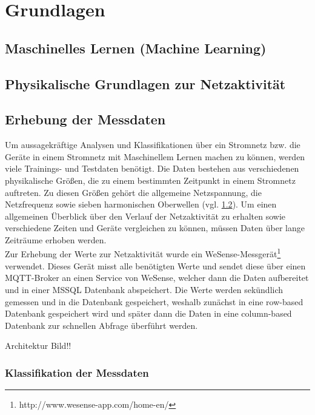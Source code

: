 \chapter{Grundlagen}

\section{Maschinelles Lernen (Machine Learning)}

\section{Physikalische Grundlagen zur Netzaktivität} \label{physikalischeGrundlagen}

\section{Erhebung der Messdaten}

    Um aussagekräftige Analysen und Klassifikationen über ein Stromnetz bzw. die Geräte in einem Stromnetz mit Maschinellem Lernen machen zu können, werden viele Trainings- und Testdaten benötigt.
    Die Daten bestehen aus verschiedenen physikalische Größen, die zu einem bestimmten Zeitpunkt in einem Stromnetz auftreten.
    Zu diesen Größen gehört die allgemeine Netzspannung, die Netzfrequenz sowie sieben harmonischen Oberwellen (vgl. \ref{physikalischeGrundlagen}).
    Um einen allgemeinen Überblick über den Verlauf der Netzaktivität zu erhalten sowie verschiedene Zeiten und Geräte vergleichen zu können, müssen Daten über lange Zeiträume erhoben werden.\\
    \newline
    Zur Erhebung der Werte zur Netzaktivität wurde ein WeSense-Messgerät\footnote{http://www.wesense-app.com/home-en/} verwendet.
    Dieses Gerät misst alle benötigten Werte und sendet diese über einen MQTT-Broker an einen Service von WeSense, welcher dann die Daten aufbereitet und in einer MSSQL Datenbank abspeichert.
    Die Werte werden sekündlich gemessen und in die Datenbank gespeichert, weshalb zunächst in eine row-based Datenbank gespeichert wird und später dann die Daten in eine column-based Datenbank zur schnellen Abfrage überführt werden.
    \newline

    Architektur Bild!!

    \subsection{Klassifikation der Messdaten}
        
